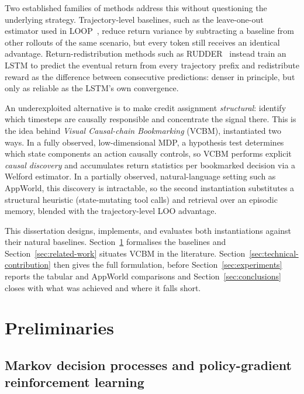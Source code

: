 Two established families of methods address this without questioning the underlying strategy. Trajectory-level baselines, such as the leave-one-out estimator used in LOOP~\cite{chen2025loop}, reduce return variance by subtracting a baseline from other rollouts of the same scenario, but every token still receives an identical advantage. Return-redistribution methods such as RUDDER~\cite{arjonaibarra2019rudder} instead train an LSTM to predict the eventual return from every trajectory prefix and redistribute reward as the difference between consecutive predictions: denser in principle, but only as reliable as the LSTM's own convergence.

An underexploited alternative is to make credit assignment \emph{structural}: identify which timesteps are causally responsible and concentrate the signal there. This is the idea behind \emph{Visual Causal-chain Bookmarking} (VCBM), instantiated two ways. In a fully observed, low-dimensional MDP, a hypothesis test determines which state components an action causally controls, so VCBM performs explicit \emph{causal discovery} and accumulates return statistics per bookmarked decision via a Welford estimator. In a partially observed, natural-language setting such as AppWorld, this discovery is intractable, so the second instantiation substitutes a structural heuristic (state-mutating tool calls) and retrieval over an episodic memory, blended with the trajectory-level LOO advantage.

This dissertation designs, implements, and evaluates both instantiations against their natural baselines. Section~\ref{sec:preliminaries} formalises the baselines and Section~\ref{sec:related-work} situates VCBM in the literature. Section~\ref{sec:technical-contribution} then gives the full formulation, before Section~\ref{sec:experiments} reports the tabular and AppWorld comparisons and Section~\ref{sec:conclusions} closes with what was achieved and where it falls short.


\section{Preliminaries}
\label{sec:preliminaries}

\subsection{Markov decision processes and policy-gradient reinforcement learning}
\label{sec:prelim-mdp}

